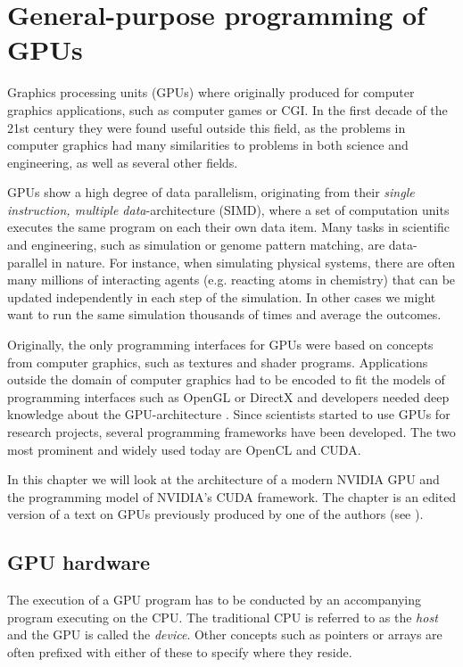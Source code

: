 \chapter{General-purpose programming of GPUs}
\label{chap:gpgpu}
Graphics processing units (GPUs) where originally produced for
computer graphics applications, such as computer games or CGI. In the
first decade of the 21st century they were found useful outside this field,
as the problems in computer graphics had many similarities to problems
in both science and engineering, as well as several other fields.

GPUs show a high degree of data parallelism, originating from their
\textit{single instruction, multiple data}-architecture (SIMD), where
a set of computation units executes the same program on each their own
data item. Many tasks in scientific and engineering, such as
simulation or genome pattern matching, are data-parallel in
nature. For instance, when simulating physical systems, there are
often many millions of interacting agents (e.g. reacting atoms in
chemistry) that can be updated independently in each step of the
simulation. In other cases we might want to run the same simulation
thousands of times and average the outcomes.

Originally, the only programming interfaces for GPUs were based on
concepts from computer graphics, such as textures and shader
programs. Applications outside the domain of computer graphics had to
be encoded to fit the models of programming interfaces such as OpenGL
or DirectX and developers needed deep knowledge about the
GPU-architecture \cite{nvidia2009fermi}. Since scientists started to
use GPUs for research projects, several programming frameworks have
been developed. The two most prominent and widely used today are
OpenCL and CUDA.

In this chapter we will look at
the architecture of a modern NVIDIA GPU and the programming model of
NVIDIA's CUDA framework. The chapter is an edited version of a text on
GPUs previously produced by one of the authors (see
\cite{dybdal2011opencl}).

\section{GPU hardware}
\label{sec:gpu_hardware}
The execution of a GPU program has to be conducted by an accompanying
program executing on the CPU. The traditional CPU is referred to as
the \textit{host} and the GPU is called the \textit{device}. Other
concepts such as pointers or arrays are often prefixed with either of
these to specify where they reside.

